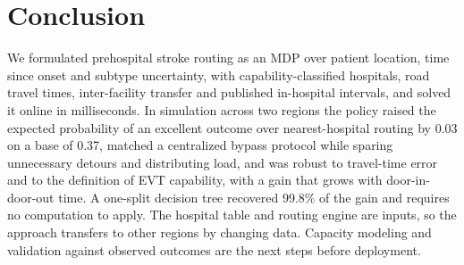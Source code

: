 \section{Conclusion}
We formulated prehospital stroke routing as an MDP over patient location, time since onset and subtype uncertainty, with capability-classified hospitals, road travel times, inter-facility transfer and published in-hospital intervals, and solved it online in milliseconds. In simulation across two regions the policy raised the expected probability of an excellent outcome over nearest-hospital routing by 0.03 on a base of 0.37, matched a centralized bypass protocol while sparing unnecessary detours and distributing load, and was robust to travel-time error and to the definition of EVT capability, with a gain that grows with door-in-door-out time. A one-split decision tree recovered 99.8\% of the gain and requires no computation to apply. The hospital table and routing engine are inputs, so the approach transfers to other regions by changing data. Capacity modeling and validation against observed outcomes are the next steps before deployment.
